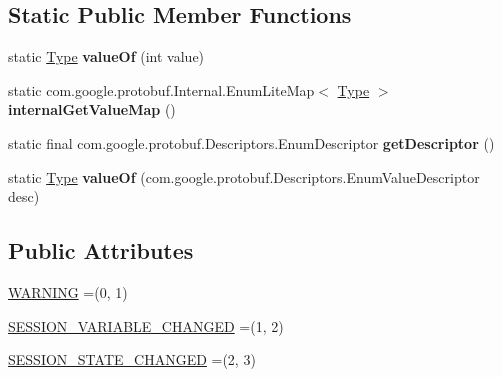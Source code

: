 \subsection*{Static Public Member Functions}
\begin{DoxyCompactItemize}
\item 
\mbox{\label{enumcom_1_1mysql_1_1cj_1_1x_1_1protobuf_1_1_mysqlx_notice_1_1_frame_1_1_type_a217989bc360e5283627626bfe6864555}} 
static \mbox{\hyperlink{enumcom_1_1mysql_1_1cj_1_1x_1_1protobuf_1_1_mysqlx_notice_1_1_frame_1_1_type}{Type}} {\bfseries value\+Of} (int value)
\item 
\mbox{\label{enumcom_1_1mysql_1_1cj_1_1x_1_1protobuf_1_1_mysqlx_notice_1_1_frame_1_1_type_aae267ea57fea8f94470ebe5c951744a6}} 
static com.\+google.\+protobuf.\+Internal.\+Enum\+Lite\+Map$<$ \mbox{\hyperlink{enumcom_1_1mysql_1_1cj_1_1x_1_1protobuf_1_1_mysqlx_notice_1_1_frame_1_1_type}{Type}} $>$ {\bfseries internal\+Get\+Value\+Map} ()
\item 
\mbox{\label{enumcom_1_1mysql_1_1cj_1_1x_1_1protobuf_1_1_mysqlx_notice_1_1_frame_1_1_type_af9bb1206ab928bd5b84b552c8ba73dd2}} 
static final com.\+google.\+protobuf.\+Descriptors.\+Enum\+Descriptor {\bfseries get\+Descriptor} ()
\item 
\mbox{\label{enumcom_1_1mysql_1_1cj_1_1x_1_1protobuf_1_1_mysqlx_notice_1_1_frame_1_1_type_a83b98fe3871ad65a3f2e7b93eee5eb53}} 
static \mbox{\hyperlink{enumcom_1_1mysql_1_1cj_1_1x_1_1protobuf_1_1_mysqlx_notice_1_1_frame_1_1_type}{Type}} {\bfseries value\+Of} (com.\+google.\+protobuf.\+Descriptors.\+Enum\+Value\+Descriptor desc)
\end{DoxyCompactItemize}
\subsection*{Public Attributes}
\begin{DoxyCompactItemize}
\item 
\mbox{\hyperlink{enumcom_1_1mysql_1_1cj_1_1x_1_1protobuf_1_1_mysqlx_notice_1_1_frame_1_1_type_a8c1f3afedf3321f90069ce36203cdc56}{W\+A\+R\+N\+I\+NG}} =(0, 1)
\item 
\mbox{\hyperlink{enumcom_1_1mysql_1_1cj_1_1x_1_1protobuf_1_1_mysqlx_notice_1_1_frame_1_1_type_a54d28ad3cde3a5c11ebe24b85f82e5ee}{S\+E\+S\+S\+I\+O\+N\+\_\+\+V\+A\+R\+I\+A\+B\+L\+E\+\_\+\+C\+H\+A\+N\+G\+ED}} =(1, 2)
\item 
\mbox{\hyperlink{enumcom_1_1mysql_1_1cj_1_1x_1_1protobuf_1_1_mysqlx_notice_1_1_frame_1_1_type_ac75fca29961449671a16d2eecc708c58}{S\+E\+S\+S\+I\+O\+N\+\_\+\+S\+T\+A\+T\+E\+\_\+\+C\+H\+A\+N\+G\+ED}} =(2, 3)
\end{DoxyCompactItemize}
